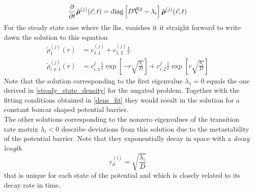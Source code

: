 \begin{equation}
    \frac{\partial }{\partial t} \tilde{\boldsymbol{\mathbf{\rho}}}^{(j)}(\vec{r},t) = {\rm diag} \left[D \vec{\nabla}^{2} - \lambda_i  \right] \tilde{\boldsymbol{\mathbf{\rho}}}^{(j)}(\vec{r},t)
    \label{fpmeq4}
\end{equation}
For the steady state case where the lhs. vanishes it it straight forward to write down the solution to this equation
\begin{align}
    \tilde{\rho}_{1}^{(j)}(r) &= c_{1,1}^{(j)} + c_{1,2}^{(j)} \frac{1}{r} \nonumber \\
    \tilde{\rho}_{i \ne 1}^{(j)}(r) &= c_{i,1}^{j}\frac{1}{r} \exp\left[-r\sqrt{\frac{\lambda_i}{D}}\right] + c_{i,2}^{j}\frac{1}{r} \exp\left[r\sqrt{\frac{\lambda_i}{D}}\right] 
    \label{fp_ind_sol}
\end{align}
Note that the solution corresponding to the first eigenvalue $\lambda_1 = 0$ equals the one derived in \eqref{steady_state_density} for the ungated problem. Together with the fitting conditions obtained in \eqref{dens_fit} they would result in the solution for a constant boxcar shaped potential barrier. \\
The other solutions corresponding to the nonzero eigenvalues of the transition rate matrix $\lambda_i<0$ describe deviations from this solution due to the metastability of the potential barrier. Note that they exponentially decay in space with a \textit{decay length}
\begin{equation}
    r_d^{(i)} = \sqrt{\frac{\lambda_i}{D}}
    \label{decay_length}
\end{equation}
that is unique for each state of the potential and which is closely related to its decay rate in time.

